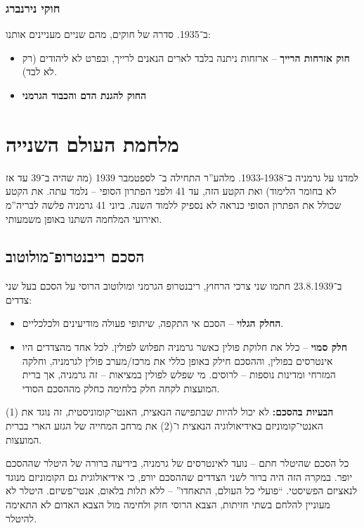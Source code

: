 \documentclass[a4paper]{book}
\begin{document}
	\subsubsection{חוקי נירנברג}
	ב־1935. סדרה של חוקים, מהם שניים מעניינים אותנו: 
	\begin{itemize}
		\item \textbf{חוק אזרחות הרייך} – ארזחות ניתנה בלבד לארים הנאנים לרייך, ובפרט לא ליהודים (רק לא לבד). 
		\item \textbf{החוק להגנת הדם והכבוד הגרמני}
	\end{itemize}
	
	\section{מלחמת העולם השנייה}
	
	
	למדנו על גרמניה ב־1933-1938. מלהע''ר התחילה ב־ לספטמבר 1939 (מה שהיה ב־39 עד אז לא בחומר הלימוד) ואת הקטע הזה, עד 41 ולפני הפתרון הסופי – נלמד עתה. את  הקטע שכולל את הפתרון הסופי כנראה לא נספיק ללמוד השנה. ביוני 41 גרמניה פלשה לבריה''מ ואירועי המלחמה השתנו באופן משמעותי. 
	
	\subsection{הסכם ריבנטרופ־מולוטוב}
	ב־23.8.1939 חתמו שני צרכי הרחוץ, ריבנטרופ הגרמני ומולוטוב הרוסי על הסכם בעל שני צדדים: 
	\begin{itemize}
		\item \textbf{החלק הגלוי} – הסכם אי התקפה, שיתופי פעולה מודיעינים ולכלכליים. 
		\item \textbf{חלק סמוי} – כלל את חלוקת פולין כאשר גרמניה תפלוש לפולין. לכל אחד מהצדדים היו אינטרסים בפולין, וההסכם חילק באופן כללי את מרכז/מערב פולין לגרמניה, וחלקה המזרחי ומדינות נוספות – לרוסים. מי שפלש לפולין במציאות  – זה גרמניה, אך ברית המועצות לקחה חלק בלחימה כחלק מההסכם הסודי. 
	\end{itemize}
	\textbf{הבעיות בהסכם: }לא יכול להיות שבתפישה הנאצית, האנטי־קומוניסטית, זה נוגד את (1) האנטי־קומוניזם באידיאולוגיה הנאצית ו־(2) את מרחב המחייה של הגזע הארי בברית המועצות. 
	
	כל הסכם שהיטלר חתם – נועד לאינטרסים של גרמניה, בידיעה ברורה של היטלר שההסכם יופר. במקרה הזה היה ברור לשני הצדדים שההסכם יורפ, כי אידיאולוגית גם הקומוניזם מנוגד לנאציזם הפשיסטי. ``פועלי כל העולם, התאחדו'' – ללא תלות בלאום, אנטי־פשיזם. היטלר לא מעוניין להלחם בשתי חזיתות, הצבא הרוסי חזק ולחימה מול הצבא האדום לא התאימה להיטלר. 
	
\end{document}
